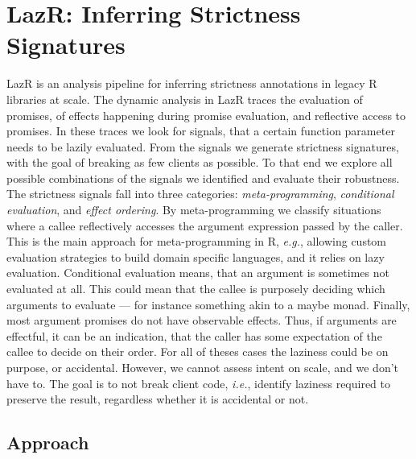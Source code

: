 \documentclass[review,nonacm,screen,acmsmall,anonymous=true]{acmart}
\newcommand{\lazr}{{\sf LazR}\xspace}
\newcommand{\eg}{\emph{e.g.},\xspace}
\newcommand{\ie}{\emph{i.e.},\xspace}
\begin{document}
\section{LazR: Inferring Strictness Signatures}\label{sec:lazr}

\lazr is an analysis pipeline for inferring strictness annotations in legacy R
libraries at scale. The dynamic analysis in \lazr traces
the evaluation of promises, of effects happening during promise evaluation, and
reflective access to promises. In these traces we look for signals, that a
certain function parameter needs to be lazily evaluated. From the signals we
generate strictness signatures, with the goal of breaking as few clients as
possible. To that end we explore all possible combinations of the signals we
identified and evaluate their robustness.
The strictness signals fall into three categories: \emph{meta-programming},
\emph{conditional evaluation}, and \emph{effect ordering}. By meta-programming we
classify situations where a callee reflectively accesses the argument expression
passed by the caller. This is the main approach for meta-programming in R, \eg
allowing custom evaluation strategies to build domain specific languages, and it
relies on lazy evaluation. Conditional evaluation means, that an argument is
sometimes not evaluated at all. This could mean that the
callee is purposely deciding which arguments to evaluate --- for instance
something akin to a maybe monad. Finally, most argument promises do not have
observable effects. Thus, if arguments are effectful, it can be
an indication, that the caller has some expectation of the callee to decide on
their order. For all of theses cases the laziness could be on purpose, or
accidental. However, we cannot assess intent on scale, and we don't have to. The
goal is to not break client code, \ie identify laziness required to preserve
the result, regardless whether it is accidental or not.

\subsection{Approach}
\end{document}
